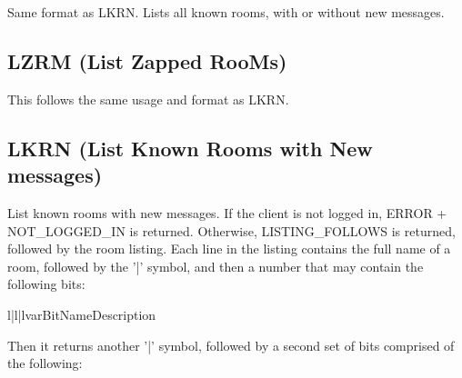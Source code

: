  Same format as LKRN.  Lists all known rooms, with or without new messages.



\subsection{LZRM (List Zapped RooMs)}

 This follows the same usage and format as LKRN.



\subsection{LKRN (List Known Rooms with New messages)}

 List known rooms with new messages.  If the client is not logged in, ERROR +
NOT_LOGGED_IN is returned.  Otherwise, LISTING_FOLLOWS is returned, followed
by the room listing.  Each line in the listing contains the full name of a
room, followed by the '|' symbol, and then a number that may contain the
following bits:

\begin{tableiii}{l|l|l}{var}{Bit}{Name}{Description}














\end{tableiii}

 Then it returns another '|' symbol, followed by a second set of bits comprised
of the following:

